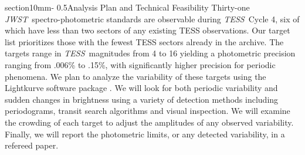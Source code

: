 \documentclass[letterpaper,12pt]{article}
\makeatletter
\renewcommand{\section}{\@startsection%
{section}{1}{0mm}{-\baselineskip}%
{0.5\baselineskip}{\normalfont\Large\bfseries}}%
\newcommand{\tess}{{\it TESS}}
\newcommand{\jwst}{{\it JWST}}
\makeatother
\begin{document}
\section{Analysis Plan and Technical Feasibility}
Thirty-one \jwst\ spectro-photometric standards are observable during \tess\ Cycle 4, six of which have less than two sectors of any existing TESS observations. Our target list prioritizes those with the fewest TESS sectors already in the archive. The targets range in \tess\ magnitudes from 4 to 16 yielding a photometric precision ranging from .006\% to .15\%, with significantly higher precision for periodic phenomena.  We plan to analyze the variability of these targets using the Lightkurve software package \citep{2018ascl.soft12013L}. We will look for both periodic variability and sudden changes in brightness using a variety of detection methods including periodograms, transit search algorithms and visual inspection. We will examine the crowding of each target to adjust the amplitudes of any observed variability. Finally, we will report the photometric limits, or any detected variability, in a refereed paper.



\clearpage

{}





\end{document}
